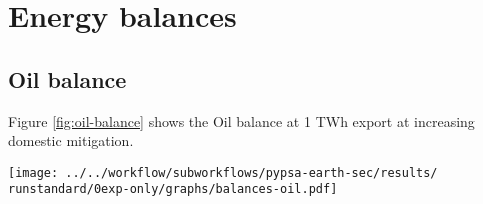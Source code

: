 \section{Energy balances}



\subsection{Oil balance}
\label{subsec:oil-balance}
Figure \ref{fig:oil-balance} shows the Oil balance at 1 TWh export at increasing domestic mitigation.

\begin{figure*}[h]
    \centering
    \texttt{[image: ../../workflow/subworkflows/pypsa-earth-sec/results/\\runstandard/0exp-only/graphs/balances-oil.pdf]}
    \caption{Oil balance at 1 TWh export at increasing domestic mitigation. The exogenously defined oil demand for land transport significantly decreases due to electrification, oil demands for industrial naphta, aviation, agriculture are constant. The demand is met by fossil oil up to 80\% mitigation, then gradually replaced by Fischer-Tropsch fuels.}
    \label{fig:oil-balance}
\end{figure*}





    
    

    
    

\clearpage